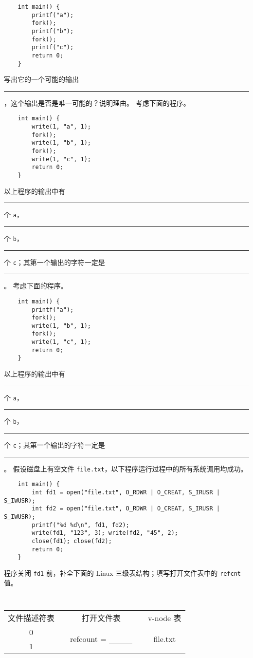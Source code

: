 \begin{problems}
\begin{verbatim}
    int main() {
        printf("a");
        fork();
        printf("b");
        fork();
        printf("c");
        return 0;
    }
        \end{verbatim}
        写出它的一个可能的输出 \rule{3.5cm}{0.25mm}，这个输出是否是唯一可能的？说明理由。
        \qn 考虑下面的程序。
        \begin{verbatim}
    int main() {
        write(1, "a", 1);
        fork();
        write(1, "b", 1);
        fork();
        write(1, "c", 1);
        return 0;
    }
        \end{verbatim}
        以上程序的输出中有 \rule{1cm}{0.25mm} 个 \verb|a|，\rule{1cm}{0.25mm} 个 \verb|b|，\rule{1cm}{0.25mm} 个 \verb|c|；其第一个输出的字符一定是 \rule{1cm}{0.25mm}。
        \qn 考虑下面的程序。
        \begin{verbatim}
    int main() {
        printf("a");
        fork();
        write(1, "b", 1);
        fork();
        write(1, "c", 1);
        return 0;
    }
        \end{verbatim}
        以上程序的输出中有 \rule{1cm}{0.25mm} 个 \verb|a|，\rule{1cm}{0.25mm} 个 \verb|b|，\rule{1cm}{0.25mm} 个 \verb|c|；其第一个输出的字符一定是 \rule{1cm}{0.25mm}。
        \pro 假设磁盘上有空文件 \verb|file.txt|，以下程序运行过程中的所有系统调用均成功。
        \begin{verbatim}
    int main() {
        int fd1 = open("file.txt", O_RDWR | O_CREAT, S_IRUSR | S_IWUSR); 
        int fd2 = open("file.txt", O_RDWR | O_CREAT, S_IRUSR | S_IWUSR); 
        printf("%d %d\n", fd1, fd2);
        write(fd1, "123", 3); write(fd2, "45", 2);
        close(fd1); close(fd2);
        return 0;
    }
        \end{verbatim}
        \qn 程序关闭 \verb|fd1| 前，补全下面的 Linux 三级表结构；填写打开文件表中的 \verb|refcnt| 值。
        \begin{table}[H]
            \tt
            \centering
            \begin{tabular}{ccccc}
                文件描述符表 & {\qquad \qquad \qquad} & 打开文件表 & {\qquad \qquad \qquad} & v-node 表 \\ \cline{1-1} \cline{3-3} \cline{5-5} 
                \multicolumn{1}{|c|}{0} & \multicolumn{1}{c|}{} & \multicolumn{1}{c|}{\multirow{2}{*}{refcount = \_\_\_\_}} & \multicolumn{1}{c|}{} & \multicolumn{1}{c|}{\multirow{6}{*}{file.txt}} \\ \cline{1-1}
                \multicolumn{1}{|c|}{1} & \multicolumn{1}{c|}{} & \multicolumn{1}{c|}{} & \multicolumn{1}{c|}{} & \multicolumn{1}{c|}{} \\ \cline{1-1} \cline{3-3}

\end{tabular}
\end{table}
\end{problems}
